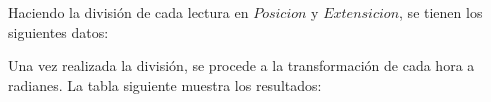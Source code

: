 \documentclass[11pt]{book}
\begin{document}
			Haciendo la división de cada lectura en $Posicion$ y $Extensicion$, se tienen los siguientes datos:

			\begin{table}[h]
				\begin{center}
				\caption{Dividido}
				\label{Dividido}
				\end{center}
			\end{table}	
			
			Una vez realizada la división, se procede a la transformación de cada hora a radianes. La tabla siguiente muestra los resultados:
			
\end{document}
